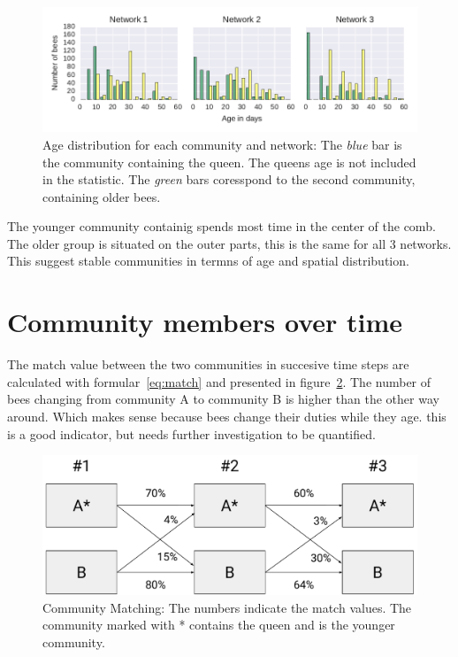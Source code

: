 \begin{figure}[htb]
	\centering
	\includegraphics[width=1.0\textwidth]{Figures/ageDistribution}
	\caption[Age distribution for each community and network] {Age distribution for each community and network: The \emph{blue} bar is the community containing the queen. The queens age is not included in the statistic. The \emph{green} bars coresspond to the second community, containing older bees.}
	\label{fig:ageDistribution}
\end{figure}


The younger community containig spends most time in the center of the comb. The older group is situated on the outer parts, this is the same for all 3 networks. This suggest stable communities in termns of age and spatial distribution.


\section{Community members over time}
 The match value between the two communities in succesive time steps are calculated with formular~\ref{eq:match} and presented in figure~\ref{fig:members}. The number of bees changing from community A to community B is higher than the other way around. Which makes sense because bees change their duties while they age. this is a good indicator, but needs further investigation to be quantified.

\begin{figure}[htb]
	\centering
	\includegraphics[width=.8\textwidth]{Figures/members}
	\caption[Community Matching]{Community Matching: The numbers indicate the match values. The community marked with * contains the queen and is the younger community.}
	\label{fig:members}
\end{figure}


